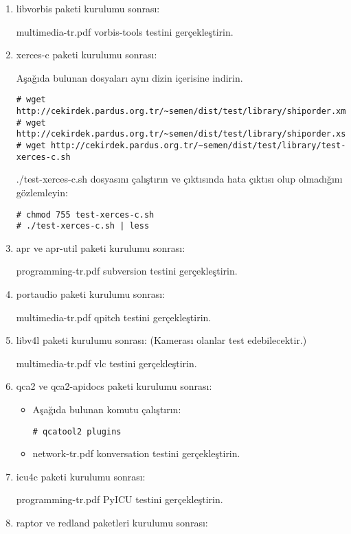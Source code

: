 \documentclass[a4paper,10pt]{article}
\begin{document}
\begin{enumerate}
\item libvorbis paketi kurulumu sonrası:

multimedia-tr.pdf vorbis-tools testini gerçekleştirin.

\item xerces-c paketi kurulumu sonrası:

Aşağıda bulunan dosyaları aynı dizin içerisine indirin.
\begin{verbatim}
# wget http://cekirdek.pardus.org.tr/~semen/dist/test/library/shiporder.xml
# wget http://cekirdek.pardus.org.tr/~semen/dist/test/library/shiporder.xsd
# wget http://cekirdek.pardus.org.tr/~semen/dist/test/library/test-xerces-c.sh
\end{verbatim}

./test-xerces-c.sh dosyasını çalıştırın ve çıktısında hata çıktısı olup olmadığını gözlemleyin:
\begin{verbatim}
# chmod 755 test-xerces-c.sh
# ./test-xerces-c.sh | less
\end{verbatim}

\item apr ve apr-util paketi kurulumu sonrası:

programming-tr.pdf subversion testini gerçekleştirin.

\item portaudio paketi kurulumu sonrası:

multimedia-tr.pdf qpitch testini gerçekleştirin.

\item libv4l paketi kurulumu sonrası: (Kamerası olanlar test edebilecektir.)


multimedia-tr.pdf vlc testini gerçekleştirin.

\item qca2 ve qca2-apidocs paketi kurulumu sonrası:
\begin{itemize}
 \item Aşağıda bulunan komutu çalıştırın:
\begin{verbatim}
# qcatool2 plugins 
\end{verbatim}
\item network-tr.pdf konversation testini gerçekleştirin.
\end{itemize}


\item icu4c paketi kurulumu sonrası:

programming-tr.pdf PyICU testini gerçekleştirin.

\item raptor ve redland paketleri kurulumu sonrası:


\end{enumerate}
\end{document}
